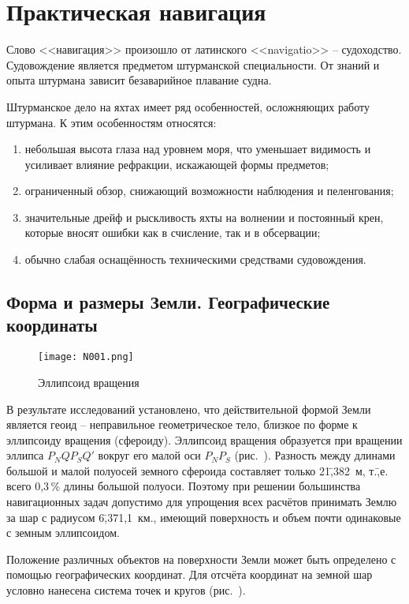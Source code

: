 \chapter{Практическая навигация}\label{chap:6}

Слово <<навигация>> произошло от латинского <<navigatio>> \---
судоходство. Судовождение является предметом штурманской
специальности. От знаний и опыта штурмана зависит безаварийное
плавание судна.

Штурманское дело на яхтах имеет ряд особенностей, осложняющих работу
штурмана. К этим особенностям относятся:
\begin{enumerate}
\item небольшая высота глаза над уровнем моря, что уменьшает видимость
  и усиливает влияние рефракции, искажающей формы предметов;
\item ограниченный обзор, снижающий возможности наблюдения и
  пеленгования;
\item значительные дрейф и рыскливость яхты на волнении и постоянный
  крен, которые вносят ошибки как в счисление, так и в обсервации;
\item обычно слабая оснащённость техническими средствами судовождения. 
\end{enumerate}

\section{Форма и размеры Земли. Географические координаты} 

\begin{wrapfigure}{O}{0.4\textwidth}
  \centering{}
  \texttt{[image: N001.png]}
  \caption{Эллипсоид вращения}
  \label{fig:N1}
\end{wrapfigure}

В результате исследований установлено, что действительной формой Земли
является геоид \--- неправильное геометрическое тело, близкое по форме
к эллипсоиду вращения (сфероиду). Эллипсоид вращения образуется при
вращении эллипса $P_NQP_SQ'$ вокруг его малой оси $P_NP_S$
(рис.~). Разность между длинами большой и малой полуосей
земного сфероида составляет только 21\=,382~м, т.\=,е. всего 0,3\,\%
длины большой полуоси. Поэтому при решении большинства навигационных
задач допустимо для упрощения всех расчётов принимать Землю за шар с
радиусом 6\=,371,1~км., имеющий поверхность и объем почти одинаковые с
земным эллипсоидом.

Положение различных объектов на поверхности Земли может быть
определено с помощью географических координат. Для отсчёта координат
на земной шар условно нанесена система точек и кругов (рис.~).

